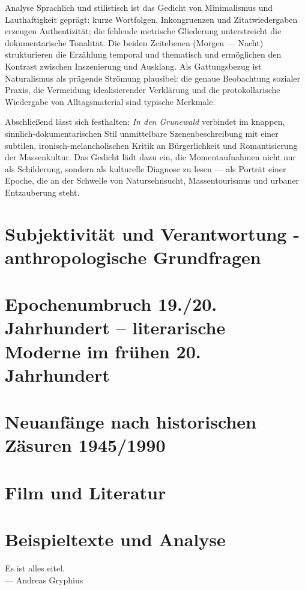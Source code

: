 \documentclass[11pt,a4paper,oneside]{article}
\begin{document}
\begin{loesung}{Analyse}
		Sprachlich und stilistisch ist das Gedicht von Minimalismus und Lauthaftigkeit geprägt: kurze Wortfolgen, Inkongruenzen und Zitatwiedergaben erzeugen Authentizität; die fehlende metrische Gliederung unterstreicht die dokumentarische Tonalität. Die beiden Zeitebenen (Morgen — Nacht) strukturieren die Erzählung temporal und thematisch und ermöglichen den Kontrast zwischen Inszenierung und Ausklang. Als Gattungsbezug ist Naturalismus als prägende Strömung plausibel: die genaue Beobachtung sozialer Praxis, die Vermeidung idealisierender Verklärung und die protokollarische Wiedergabe von Alltagsmaterial sind typische Merkmale.
		
		Abschließend lässt sich festhalten: \textit{In den Grunewald} verbindet im knappen, sinnlich-dokumentarischen Stil unmittelbare Szenenbeschreibung mit einer subtilen, ironisch-melancholischen Kritik an Bürgerlichkeit und Romantisierung der Massenkultur. Das Gedicht lädt dazu ein, die Momentaufnahmen nicht nur als Schilderung, sondern als kulturelle Diagnose zu lesen — als Porträt einer Epoche, die an der Schwelle von Natursehnsucht, Massentourismus und urbaner Entzauberung steht.
	\end{loesung}
	
	\newpage
	
	
	\section{Subjektivität und Verantwortung - anthropologische Grundfragen}
	\section{Epochenumbruch 19./20. Jahrhundert – literarische Moderne im frühen 20. Jahrhundert}
	\section{Neuanfänge nach historischen Zäsuren 1945/1990}
	\section{Film und Literatur}
	
	\newpage
	
	\section{Beispieltexte und Analyse}
	
	\begin{zitat}
		Es ist alles eitel. \\
		— Andreas Gryphius
	\end{zitat}
	
\end{document}
